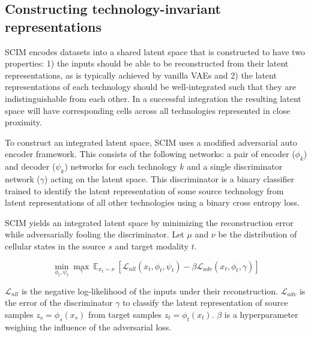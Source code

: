 \subsection{Constructing technology-invariant representations}
SCIM encodes datasets into a shared latent space that is constructed to have two properties:
1) the inputs should be able to be reconstructed from their latent representations, as is typically achieved by vanilla VAEs
and 2) the latent representations of each technology should be well-integrated such that they are indistinguishable from each other.
In a successful integration the resulting latent space will have corresponding cells across all technologies represented in close proximity.

To construct an integrated latent space, SCIM uses a modified adversarial auto encoder framework.
This consists of the following networks: a pair of encoder ($\phi_k$) and decoder ($\psi_k$) networks for each technology $k$ and a single discriminator network ($\gamma$) acting on the latent space.
This discriminator is a binary classifier trained to identify the latent representation of some source technology from latent representations of all other technologies using a binary cross entropy loss.

SCIM yields an integrated latent space by minimizing the reconstruction error while adversarially fooling the discriminator.
Let $\mu$ and $\nu$ be the distribution of cellular states in the source $s$ and target modality $t$.

\begin{equation}
	\min_{\phi_t, \psi_t} \max_\gamma  \
	\mathbb{E}_{x_t \sim \nu} \
	[ \mathcal{L}_{nll}(x_t, \phi_t, \psi_t) - \beta \mathcal{L}_{adv}(x_t, \phi_t, \gamma) ]
  \label{eq:scim-loss}
\end{equation}

$\mathcal{L}_{nll}$ is the negative log-likelihood of the inputs under their reconstruction.
$\mathcal{L}_{adv}$ is the error of the discriminator $\gamma$ to classify the latent representation of source samples $z_s = \phi_s(x_s)$ from target samples $z_t = \phi_t(x_t)$.
$\beta$ is a hyperparameter weighing the influence of the adversarial loss.

